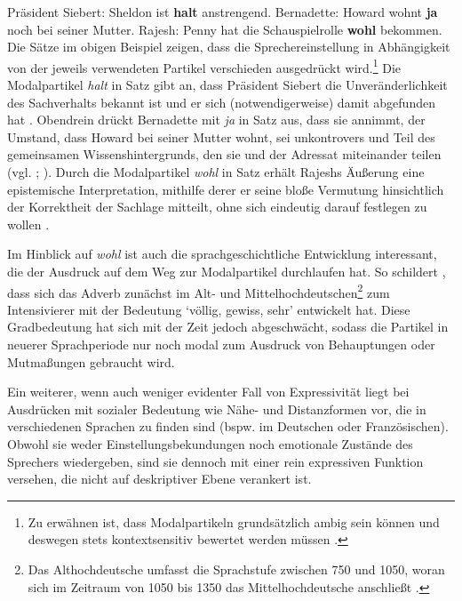 \ea  \label{MoPa}
\ea Präsident Siebert: \glqq{}Sheldon ist \textbf{halt} anstrengend.\grqq{} \label{siebert2}
\ex Bernadette: \glqq{}Howard wohnt \textbf{ja} noch bei seiner Mutter.\grqq{} \label{bernadette2}
\ex Rajesh: \glqq{}Penny hat die Schauspielrolle \textbf{wohl} bekommen.\grqq{} \label{raj2}
 \z
 \z
Die Sätze im obigen Beispiel zeigen, dass die Sprechereinstellung in Abhängigkeit von der jeweils verwendeten Partikel verschieden ausgedrückt wird.\footnote{Zu erwähnen ist, dass Modalpartikeln grundsätzlich ambig sein können und deswegen stets kontextsensitiv bewertet werden müssen \citep[vgl.][603]{Duden.2016}.} Die Modalpartikel \textit{halt} in Satz  gibt an, dass Präsident Siebert die Unveränderlichkeit des Sachverhalts bekannt ist und er sich (notwendigerweise) damit abgefunden hat \citep[vgl.][10]{Abraham.1986}. Obendrein drückt Bernadette mit \textit{ja} in Satz  aus, dass sie annimmt, der Umstand, dass Howard bei seiner Mutter wohnt, sei unkontrovers und Teil des gemeinsamen Wissenshintergrunds, den sie und der Adressat miteinander teilen (vgl. {\citealt[36f.]{Weydt.1969}}; {\citealt[19]{Abraham.1986}}). Durch die Modalpartikel \textit{wohl} in Satz  erhält {Rajeshs} {Äußerung} eine epistemische Interpretation, mithilfe derer er seine bloße Vermutung hinsichtlich der Korrektheit der Sachlage mitteilt, ohne sich eindeutig darauf festlegen zu wollen \citep[vgl.][18]{Abraham.1986}.

Im Hinblick auf \textit{wohl} ist auch die sprachgeschichtliche Entwicklung interessant, die der Ausdruck auf dem Weg zur Modalpartikel durchlaufen hat. So schildert \citet[219f.]{Kip.1900}, dass sich das Adverb zunächst im Alt- und Mittelhochdeutschen\footnote{Das Althochdeutsche umfasst die Sprachstufe zwischen 750 und 1050, woran sich im Zeitraum von 1050 bis 1350 das Mittelhochdeutsche anschließt \citep[vgl.][5f.]{Nuebling.2013}.} zum Intensivierer mit der Bedeutung `völlig, gewiss, sehr' entwickelt hat. Diese Gradbedeutung hat sich mit der Zeit jedoch abgeschwächt, sodass die Partikel in neuerer Sprachperiode nur noch modal zum Ausdruck von Behauptungen oder Mutmaßungen gebraucht wird.


Ein weiterer, wenn auch weniger evidenter Fall von Expressivität liegt bei Ausdrücken mit sozialer Bedeutung wie Nähe- und Distanzformen vor, die in verschiedenen Sprachen zu finden sind (bspw. im Deutschen oder Französischen). Obwohl sie weder Einstellungsbekundungen noch emotionale Zustände des Sprechers wiedergeben, sind sie dennoch mit einer rein expressiven Funktion versehen, die nicht auf deskriptiver Ebene {verankert ist}.

